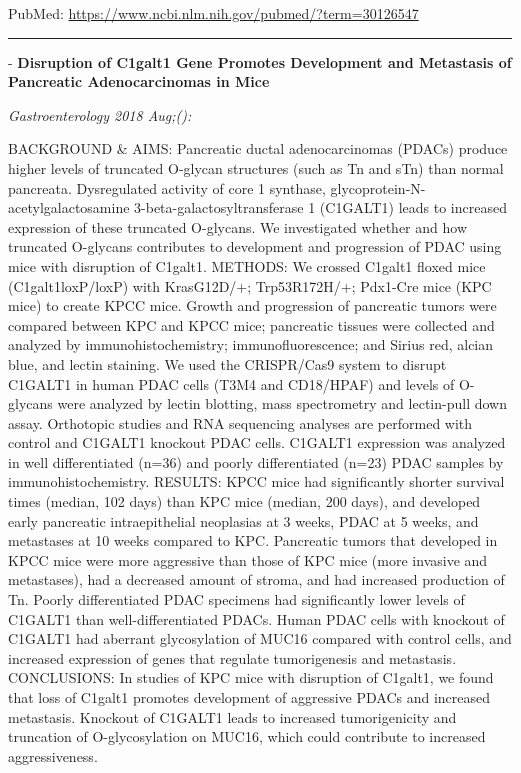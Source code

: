 \documentclass[]{article}
\begin{document}
PubMed: \url{https://www.ncbi.nlm.nih.gov/pubmed/?term=30126547}

{}

{}

\begin{center}\rule{0.5\linewidth}{\linethickness}\end{center}

 - \textbf{Disruption of C1galt1 Gene Promotes Development and
Metastasis of Pancreatic Adenocarcinomas in Mice}

\emph{Gastroenterology 2018 Aug;():}

BACKGROUND \& AIMS: Pancreatic ductal adenocarcinomas (PDACs) produce
higher levels of truncated O-glycan structures (such as Tn and sTn) than
normal pancreata. Dysregulated activity of core 1 synthase,
glycoprotein-N-acetylgalactosamine 3-beta-galactosyltransferase 1
(C1GALT1) leads to increased expression of these truncated O-glycans. We
investigated whether and how truncated O-glycans contributes to
development and progression of PDAC using mice with disruption of
C1galt1. METHODS: We crossed C1galt1 floxed mice (C1galt1loxP/loxP) with
KrasG12D/+; Trp53R172H/+; Pdx1-Cre mice (KPC mice) to create KPCC mice.
Growth and progression of pancreatic tumors were compared between KPC
and KPCC mice; pancreatic tissues were collected and analyzed by
immunohistochemistry; immunofluorescence; and Sirius red, alcian blue,
and lectin staining. We used the CRISPR/Cas9 system to disrupt C1GALT1
in human PDAC cells (T3M4 and CD18/HPAF) and levels of O-glycans were
analyzed by lectin blotting, mass spectrometry and lectin-pull down
assay. Orthotopic studies and RNA sequencing analyses are performed with
control and C1GALT1 knockout PDAC cells. C1GALT1 expression was analyzed
in well differentiated (n=36) and poorly differentiated (n=23) PDAC
samples by immunohistochemistry. RESULTS: KPCC mice had significantly
shorter survival times (median, 102 days) than KPC mice (median, 200
days), and developed early pancreatic intraepithelial neoplasias at 3
weeks, PDAC at 5 weeks, and metastases at 10 weeks compared to KPC.
Pancreatic tumors that developed in KPCC mice were more aggressive than
those of KPC mice (more invasive and metastases), had a decreased amount
of stroma, and had increased production of Tn. Poorly differentiated
PDAC specimens had significantly lower levels of C1GALT1 than
well-differentiated PDACs. Human PDAC cells with knockout of C1GALT1 had
aberrant glycosylation of MUC16 compared with control cells, and
increased expression of genes that regulate tumorigenesis and
metastasis. CONCLUSIONS: In studies of KPC mice with disruption of
C1galt1, we found that loss of C1galt1 promotes development of
aggressive PDACs and increased metastasis. Knockout of C1GALT1 leads to
increased tumorigenicity and truncation of O-glycosylation on MUC16,
which could contribute to increased aggressiveness.
\end{document}
